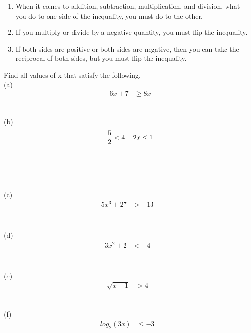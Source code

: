 \begin{enumerate}
	\item
	      When it comes to addition, subtraction, multiplication, and division, what you do to one side of the inequality, you must do to the other. \\

	\item
	      If you multiply or divide by a negative quantity, you must flip the inequality. \\

	\item
	      If both sides are positive or both sides are negative, then you can take the reciprocal of both sides, but you must flip the inequality. \\
\end{enumerate}

\begin{exercise}\nonumber
	Find all values of x that satisfy the following. \\

	(a)
	\begin{align}
		-6x + 7 & \ge 8x \\
		\\
		\\
	\end{align} \\

	(b)
	\begin{align}
		-{5 \over 2} < 4 - 2x \le 1 \\
		\\
		\\
		\\
	\end{align} \\

	(c)
	\begin{align}
		5x^3 + 27 & > -13 \\
		\\
		\\
		\\
	\end{align} \\

	(d)
	\begin{align}
		3x^2 + 2 & < -4 \\
		\\
		\\
		\\
	\end{align} \\

	(e)
	\begin{align}
		\sqrt{x-1} & > 4 \\
		\\
		\\
	\end{align} \\

	(f)
	\begin{align}
		log_2(3x) & \le -3 \\
		\\
		\\
		\\
	\end{align}
\end{exercise}

